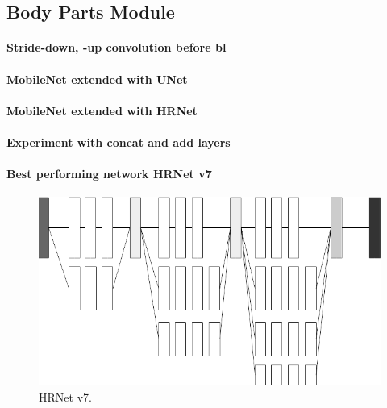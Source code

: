\subsection{Body Parts Module }
\label{RBP}


\paragraph{Stride-down, -up convolution before \gls{bl}}

\paragraph{MobileNet extended with UNet}
\paragraph{MobileNet extended with HRNet}

\paragraph{Experiment with concat and add layers}

\paragraph{Best performing network HRNet v7}

\begin{figure}[H]
    \centering
    \includegraphics[width=\textwidth,height=\textheight,keepaspectratio]{img/network_v7_hrnet.png}
    \decoRule
    \caption[HRNet v7]{HRNet v7.}
    \label{fig:hrnet-v7}
\end{figure}


